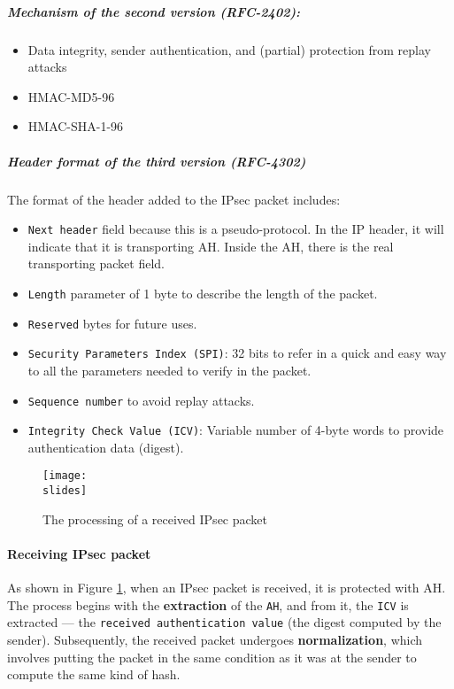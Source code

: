 \subparagraph{Mechanism of the \textbf{second version} (RFC-2402):}
\begin{itemize}
    \item Data integrity, sender authentication, and (partial) protection from replay attacks
    \item HMAC-MD5-96
    \item HMAC-SHA-1-96
\end{itemize}

\subparagraph{Header format of the third version (RFC-4302)}
The format of the header added to the IPsec packet includes:
\begin{itemize}
    \item \texttt{Next header} field because this is a pseudo-protocol. In the IP header, it will indicate that it is transporting AH. Inside the AH, there is the real transporting packet field.
    \item \texttt{Length} parameter of 1 byte to describe the length of the packet.
    \item \texttt{Reserved} bytes for future uses.
    \item \texttt{Security Parameters Index (SPI)}: 32 bits to refer in a quick and easy way to all the parameters needed to verify in the packet.
    \item \texttt{Sequence number} to avoid replay attacks.
    \item \texttt{Integrity Check Value (ICV)}: Variable number of 4-byte words to provide authentication data (digest).
\end{itemize}



\begin{figure}[h]
    \centering
    \texttt{[image: \\slides]}
    \caption{The processing of a received IPsec packet}
    \label{fig:IPsec-receiving-packet}
\end{figure}

\paragraph{Receiving IPsec packet}
As shown in Figure \ref*{fig:IPsec-receiving-packet}, when an IPsec packet is received, it is protected with AH. The process begins with the \textbf{extraction} of the \texttt{AH}, and from it, the  \texttt{ICV} is extracted — the \texttt{received authentication value} (the digest computed by the sender).
Subsequently, the received packet undergoes \textbf{normalization}, which involves putting the packet in the same condition as it was at the sender to compute the same kind of hash.

